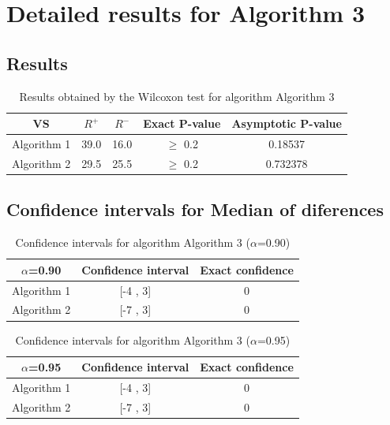 \documentclass[a4paper,10pt]{article}
\begin{document}
 \clearpage 


\section{Detailed results for Algorithm 3}


\subsection{Results}

\begin{table}[!htp]
\centering\small
\begin{tabular}{
|c|c|c|c|c|}
\hline
 VS & $R^{+}$ & $R^{-}$ & Exact P-value & Asymptotic P-value \\ \hline 
Algorithm 1 & 39.0 & 16.0 & $\geq$ 0.2 & 0.18537\\ \hline 
Algorithm 2 & 29.5 & 25.5 & $\geq$ 0.2 & 0.732378\\ \hline 

\end{tabular}
\caption{Results obtained by the Wilcoxon test for algorithm Algorithm 3}
\end{table}

\subsection{Confidence intervals for Median of diferences}

\begin{table}[!htp]
\centering\small
\begin{tabular}{
|c|c|c|}
\hline
 $\alpha$=0.90 & Confidence interval & Exact confidence \\ \hline 
Algorithm 1 & [-4 , 3] & 0\\ \hline 
Algorithm 2 & [-7 , 3] & 0\\ \hline 

\end{tabular}
\caption{Confidence intervals for algorithm Algorithm 3 ($\alpha$=0.90)}
\end{table}
\begin{table}[!htp]
\centering\small
\begin{tabular}{
|c|c|c|}
\hline
 $\alpha$=0.95 & Confidence interval & Exact confidence \\ \hline 
Algorithm 1 & [-4 , 3] & 0\\ \hline 
Algorithm 2 & [-7 , 3] & 0\\ \hline 

\end{tabular}
\caption{Confidence intervals for algorithm Algorithm 3 ($\alpha$=0.95)}
\end{table}

 \clearpage 
\end{document}

